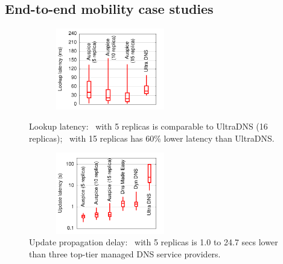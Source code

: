 



\subsection{End-to-end mobility case studies}
\label{sec:e2e}

\begin{figure}[ht]
	\vspace{0.05in}
	\begin{minipage}[b]{0.48\linewidth}
		\centering
		\includegraphics[width=2.8in,height=1.4in]{graph/newgraphs/managed-lookup.pdf}
		\figvsp
		\caption{Lookup latency:  \auspice\ with 5 replicas is comparable to UltraDNS (16 replicas); \auspice\ with 15 replicas has 60\% lower latency than UltraDNS.}
		\label{fig:managed-lookup}
	\end{minipage}
	\hspace{0.2in}
	\begin{minipage}[b]{0.48\linewidth}
		\centering
		\includegraphics[width=2.8in,height=1.4in]{graph/newgraphs/managed-update.pdf}
		\figvsp
		\caption{Update propagation delay: \auspice\ with 5 replicas is  1.0 to 24.7 secs lower than three top-tier managed DNS service providers. }
		\label{fig:manageddnsupdate}
	\end{minipage}
	\vspace{-0.25in}
\end{figure}




